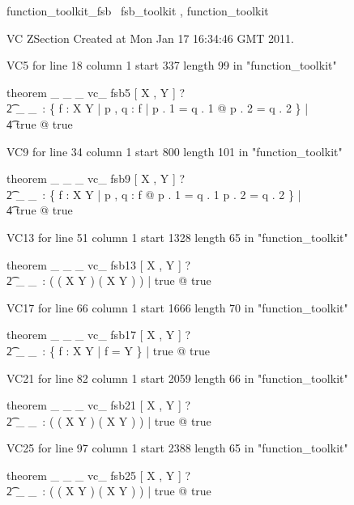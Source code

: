 \documentclass{article}
\begin{document}

\begin{zsection}
	 \SECTION function\_toolkit\_fsb \parents~fsb\_toolkit , function\_toolkit
\end{zsection}

VC ZSection Created at Mon Jan 17 16:34:46 GMT 2011.

VC5 for line 18 column 1 start 337 length 99 in "function_toolkit"
\begin{zed}
theorem  \_  {\pfun} \_  \_ vc\_ fsb5 [ X , Y ] \vdash ? \\
   \t2 \exists \_ \pfun \_~: \power \{ f : X \rel Y | \forall p , q : f | p . 1 = q . 1 @ p . 2 = q . 2 \} | \\
     \t4 true @ true
\end{zed}

VC9 for line 34 column 1 start 800 length 101 in "function_toolkit"
\begin{zed}
theorem  \_  {\pinj} \_  \_ vc\_ fsb9 [ X , Y ] \vdash ? \\
   \t2 \exists \_ \pinj \_~: \power \{ f : X \rel Y | \forall p , q : f @ p . 1 = q . 1 \iff p . 2 = q . 2 \} | \\
     \t4 true @ true
\end{zed}

VC13 for line 51 column 1 start 1328 length 65 in "function_toolkit"
\begin{zed}
theorem  \_  {\inj} \_  \_ vc\_ fsb13 [ X , Y ] \vdash ? \\
   \t2 \exists \_ \inj \_~: \power ( ( X \pinj Y ) \cap ( X \fun Y ) ) | true @ true
\end{zed}

VC17 for line 66 column 1 start 1666 length 70 in "function_toolkit"
\begin{zed}
theorem  \_  {\psurj} \_  \_ vc\_ fsb17 [ X , Y ] \vdash ? \\
   \t2 \exists \_ \psurj \_~: \power \{ f : X \pfun Y | \ran f = Y \} | true @ true
\end{zed}

VC21 for line 82 column 1 start 2059 length 66 in "function_toolkit"
\begin{zed}
theorem  \_  {\surj} \_  \_ vc\_ fsb21 [ X , Y ] \vdash ? \\
   \t2 \exists \_ \surj \_~: \power ( ( X \psurj Y ) \cap ( X \fun Y ) ) | true @ true
\end{zed}

VC25 for line 97 column 1 start 2388 length 65 in "function_toolkit"
\begin{zed}
theorem  \_  {\bij} \_  \_ vc\_ fsb25 [ X , Y ] \vdash ? \\
   \t2 \exists \_ \bij \_~: \power ( ( X \surj Y ) \cap ( X \inj Y ) ) | true @ true
\end{zed}
\end{document}
